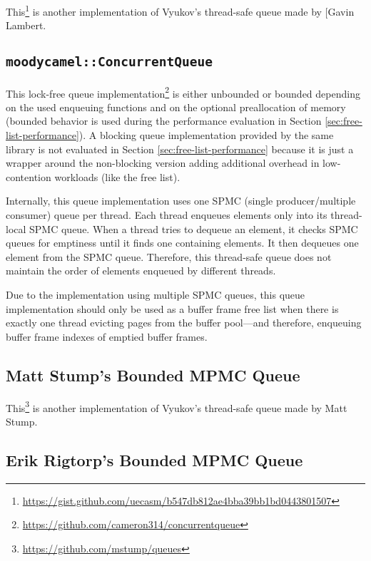     This\footnote{\url{https://gist.github.com/uecasm/b547db812ae4bba39bb1bd0443801507}} is another implementation of Vyukov's thread-safe queue made by [Gavin Lambert.

\subsection[\lstinline{moodycamel::ConcurrentQueue}]{\lstinline{moodycamel::ConcurrentQueue}} \label{subsec:moodycamel}

    This lock-free queue implementation\footnote{\url{https://github.com/cameron314/concurrentqueue}} is either unbounded or bounded depending on the used enqueuing functions and on the optional preallocation of memory (bounded behavior is used during the performance evaluation in Section \ref{sec:free-list-performance}). A blocking queue implementation provided by the same library is not evaluated in Section \ref{sec:free-list-performance} because it is just a wrapper around the non-blocking version adding additional overhead in low-contention workloads (like the free list).

    Internally, this queue implementation uses one SPMC (single producer/multiple consumer) queue per thread. Each thread enqueues elements only into its thread-local SPMC queue. When a thread tries to dequeue an element, it checks SPMC queues for emptiness until it finds one containing elements. It then dequeues one element from the SPMC queue. Therefore, this thread-safe queue does not maintain the order of elements enqueued by different threads.

    Due to the implementation using multiple SPMC queues, this queue implementation should only be used as a buffer frame free list when there is exactly one thread evicting pages from the buffer pool---and therefore, enqueuing buffer frame indexes of emptied buffer frames.

\subsection[Matt Stump's MPMC Queue]{Matt Stump's Bounded MPMC Queue} \label{subsec:vyukov-variation}

    This\footnote{\url{https://github.com/mstump/queues}} is another implementation of Vyukov's thread-safe queue made by Matt Stump.

\subsection[Erik Rigtorp's MPMC Queue]{Erik Rigtorp's Bounded MPMC Queue} \label{subsec:rigtorp}

